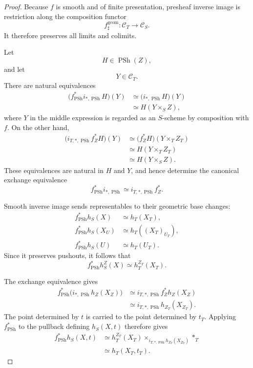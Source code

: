 \begin{proof}
Because \(f\) is smooth and of finite presentation, presheaf inverse
image is restriction along the composition functor
\[
    f^{\mathrm{geom}}_\sharp
    \colon
    \mathcal C_T
    \longrightarrow
    \mathcal C_S.
\]
It therefore preserves all limits and colimits.

Let
\[
    H
    \in
    \operatorname{PSh}(Z),
\]
and let
\[
    Y
    \in
    \mathcal C_T.
\]
There are natural equivalences
\[
\begin{aligned}
    \bigl(
        f^*_{\operatorname{PSh}}
        i_{*,\operatorname{PSh}}H
    \bigr)(Y)
    &\simeq
    \bigl(
        i_{*,\operatorname{PSh}}H
    \bigr)(Y)
    \\
    &\simeq
    H(Y\times_SZ),
\end{aligned}
\]
where \(Y\) in the middle expression is regarded as an \(S\)-scheme by
composition with \(f\).  On the other hand,
\[
\begin{aligned}
    \bigl(
        i_{T,*,\operatorname{PSh}}
        f_Z^*H
    \bigr)(Y)
    &\simeq
    \bigl(
        f_Z^*H
    \bigr)(Y\times_TZ_T)
    \\
    &\simeq
    H(Y\times_TZ_T)
    \\
    &\simeq
    H(Y\times_SZ).
\end{aligned}
\]
These equivalences are natural in \(H\) and \(Y\), and hence determine
the canonical exchange equivalence
\[
    f^*_{\operatorname{PSh}}
    i_{*,\operatorname{PSh}}
    \simeq
    i_{T,*,\operatorname{PSh}}
    f_Z^*.
\]

Smooth inverse image sends representables to their geometric base
changes:
\[
\begin{aligned}
    f^*_{\operatorname{PSh}}h_S(X)
    &\simeq
    h_T(X_T),
    \\
    f^*_{\operatorname{PSh}}h_S(X_U)
    &\simeq
    h_T((X_T)_{U_T}),
    \\
    f^*_{\operatorname{PSh}}h_S(U)
    &\simeq
    h_T(U_T).
\end{aligned}
\]
Since it preserves pushouts, it follows that
\[
    f^*_{\operatorname{PSh}}h_S^Z(X)
    \simeq
    h_T^{Z_T}(X_T).
\]

The exchange equivalence gives
\[
\begin{aligned}
    f^*_{\operatorname{PSh}}
    \bigl(
        i_{*,\operatorname{PSh}}h_Z(X_Z)
    \bigr)
    &\simeq
    i_{T,*,\operatorname{PSh}}
    f_Z^*h_Z(X_Z)
    \\
    &\simeq
    i_{T,*,\operatorname{PSh}}
    h_{Z_T}(X_{Z_T}).
\end{aligned}
\]
The point determined by \(t\) is carried to the point determined by
\(t_T\).  Applying \(f^*_{\operatorname{PSh}}\) to the pullback
defining \(h_S(X,t)\) therefore gives
\[
\begin{aligned}
    f^*_{\operatorname{PSh}}h_S(X,t)
    &\simeq
    h_T^{Z_T}(X_T)
    \times_{
        i_{T,*,\operatorname{PSh}}
        h_{Z_T}(X_{Z_T})
    }
    *_T
    \\
    &\simeq
    h_T(X_T,t_T).
\end{aligned}
\]


\end{proof}
